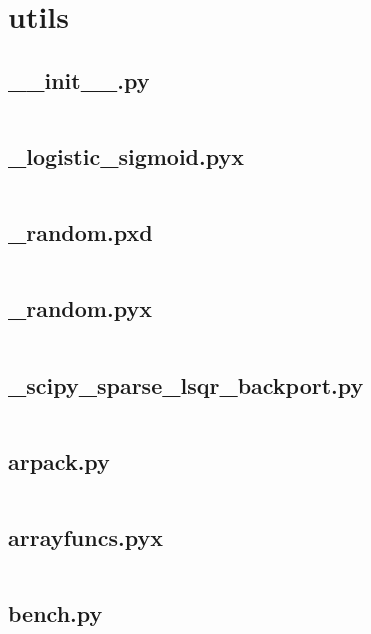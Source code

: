 \documentclass{article}
\begin{document}
\section{utils}

\subsection{\_\_init\_\_.py}
\inputminted{python}{/home/dufferzafar/dev/@clones/scikit-learn/sklearn/utils/__init__.py}
\newpage

\subsection{\_logistic\_sigmoid.pyx}
\inputminted{cython}{/home/dufferzafar/dev/@clones/scikit-learn/sklearn/utils/_logistic_sigmoid.pyx}
\newpage

\subsection{\_random.pxd}
\inputminted{cython}{/home/dufferzafar/dev/@clones/scikit-learn/sklearn/utils/_random.pxd}
\newpage

\subsection{\_random.pyx}
\inputminted{cython}{/home/dufferzafar/dev/@clones/scikit-learn/sklearn/utils/_random.pyx}
\newpage

\subsection{\_scipy\_sparse\_lsqr\_backport.py}
\inputminted{python}{/home/dufferzafar/dev/@clones/scikit-learn/sklearn/utils/_scipy_sparse_lsqr_backport.py}
\newpage

\subsection{arpack.py}
\inputminted{python}{/home/dufferzafar/dev/@clones/scikit-learn/sklearn/utils/arpack.py}
\newpage

\subsection{arrayfuncs.pyx}
\inputminted{cython}{/home/dufferzafar/dev/@clones/scikit-learn/sklearn/utils/arrayfuncs.pyx}
\newpage

\subsection{bench.py}
\inputminted{python}{/home/dufferzafar/dev/@clones/scikit-learn/sklearn/utils/bench.py}
\newpage
\end{document}
